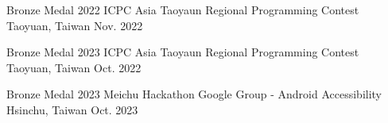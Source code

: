 



\begin{cvhonors}
%
\cvhonor
{Bronze Medal} 
{2022 ICPC Asia Taoyaun Regional Programming Contest} 
{Taoyuan, Taiwan} 
{Nov. 2022}

\cvhonor
{Bronze Medal} 
{2023 ICPC Asia Taoyaun Regional Programming Contest} 
{Taoyuan, Taiwan} 
{Oct. 2022}


\cvhonor
    {Bronze Medal} 
    {2023 Meichu Hackathon Google Group - Android Accessibility} 
    {Hsinchu, Taiwan} 
    {Oct. 2023}

\end{cvhonors}





%
